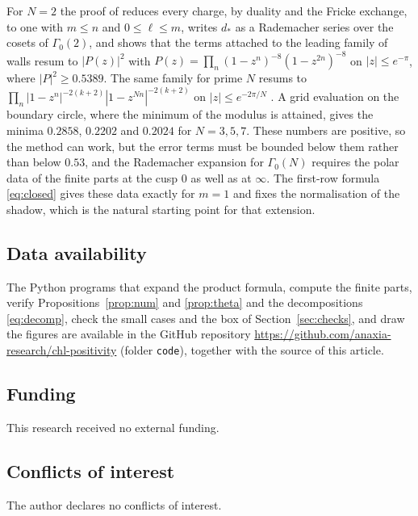 \documentclass[11pt]{amsart}
\numberwithin{equation}{section}
\theoremstyle{plain}
\theoremstyle{remark}
\begin{document}
For $N=2$ the proof of \cite{Bha26a} reduces every charge, by duality and the Fricke exchange, to one with $m\le n$ and $0\le\ell\le m$, writes $d_*$ as a Rademacher series over the cosets of $\Gamma_0(2)$, and shows that the terms attached to the leading family of walls resum to $|P(z)|^2$ with $P(z)=\prod_n(1-z^n)^{-8}(1-z^{2n})^{-8}$ on $|z|\le e^{-\pi}$, where $|P|^2\ge0.5389$. The same family for prime $N$ resums to $\prod_n|1-z^n|^{-2(k+2)}|1-z^{Nn}|^{-2(k+2)}$ on $|z|\le e^{-2\pi/N}$ \cite[Section~16]{Bha26a}. A grid evaluation on the boundary circle, where the minimum of the modulus is attained, gives the minima $0.2858$, $0.2202$ and $0.2024$ for $N=3,5,7$. These numbers are positive, so the method can work, but the error terms must be bounded below them rather than below $0.53$, and the Rademacher expansion for $\Gamma_0(N)$ requires the polar data of the finite parts at the cusp $0$ as well as at $\infty$. The first-row formula \eqref{eq:closed} gives these data exactly for $m=1$ and fixes the normalisation of the shadow, which is the natural starting point for that extension.

\subsection*{Data availability}
The Python programs that expand the product formula, compute the finite parts, verify Propositions~\ref{prop:num} and \ref{prop:theta} and the decompositions \eqref{eq:decomp}, check the small cases and the box of Section~\ref{sec:checks}, and draw the figures are available in the GitHub repository \url{https://github.com/anaxia-research/chl-positivity} (folder \texttt{code}), together with the source of this article.

\subsection*{Funding}
This research received no external funding.

\subsection*{Conflicts of interest}
The author declares no conflicts of interest.
\end{document}
